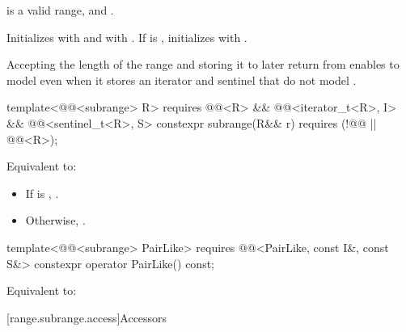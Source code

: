 \begin{itemdescr}
\pnum
\expects
{} is a valid range, and
.

\pnum
\effects
Initializes  with  and  with
. If  is , initializes  with
.

\pnum
\begin{note}
Accepting the length of the range and storing it to later return  from
 enables  to model  even
when it stores an iterator and sentinel that do not model
.
\end{note}
\end{itemdescr}

%
\begin{itemdecl}
template<@@<subrange> R>
  requires @@<R> &&
           @@<iterator_t<R>, I> &&
           @@<sentinel_t<R>, S>
constexpr subrange(R&& r) requires (!@@ || @@<R>);
\end{itemdecl}

\begin{itemdescr}
\pnum
\effects
Equivalent to:
\begin{itemize}
\item If  is ,
.
\item Otherwise, .
\end{itemize}
\end{itemdescr}

%
\begin{itemdecl}
template<@@<subrange> PairLike>
  requires @@<PairLike, const I&, const S&>
constexpr operator PairLike() const;
\end{itemdecl}

\begin{itemdescr}
\pnum
\effects
Equivalent to: 
\end{itemdescr}

[range.subrange.access]{Accessors}

